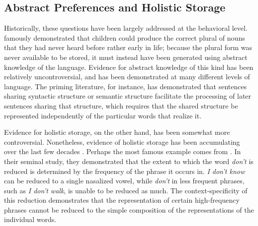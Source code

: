 \documentclass[11pt]{article}
\begin{document}
\subsection{Abstract Preferences and Holistic
Storage}\label{abstract-preferences-and-holistic-storage}

Historically, these questions have been largely addressed at the
behavioral level. \citet{berkoChildsLearningEnglish1958} famously
demonstrated that children could produce the correct plural of nouns
that they had never heard before rather early in life; because the
plural form was never available to be stored, it must instead have been
generated using abstract knowledge of the language. Evidence for
abstract knowledge of this kind has been relatively uncontroversial, and
has been demonstrated at many different levels of language. The priming
literature, for instance, has demonstrated that sentences sharing
syntactic structure
\citep[e.g.,][]{bock1986syntacticpersistencelanguage} or semantic
structure \citep[e.g.,][]{meyer1971facilitationrecognizingpairs}
facilitate the processing of later sentences sharing that structure,
which requires that the shared structure be represented independently of
the particular words that realize it.

Evidence for holistic storage, on the other hand, has been somewhat more
controversial. Nonetheless, evidence of holistic storage has been
accumulating over the last few decades
\citep{stembergerFrequencyLexicalStorage1986, bybee1999usagebasedphonology, stembergerAreInflectedForms2004, kapatsinskiFrequencyEmergencePrefabs2009, raymondBrown2012frequency, morgan2015, morgan2016, raymondBrownHealy2016cumulative, morgan2024productiveknowledgeitemspecific, houghton2025multiwordrepresentationsminds}.
Perhaps the most famous example comes from
\citet{bybeeEffectUsageDegrees1999}. In their seminal study, they
demonstrated that the extent to which the word \emph{don't} is reduced
is determined by the frequency of the phrase it occurs in. \emph{I don't
know} can be reduced to a single nasalized vowel, while \emph{don't} in
less frequent phrases, such as \emph{I don't walk}, is unable to be
reduced as much. The context-specificity of this reduction demonstrates
that the representation of certain high-frequency phrases cannot be
reduced to the simple composition of the representations of the
individual words.
\end{document}
